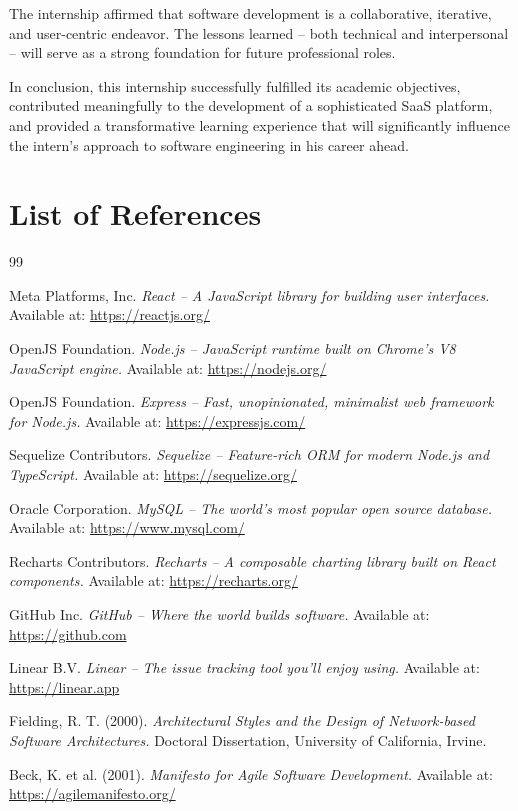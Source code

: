 \documentclass[12pt,a4paper]{article}
\begin{document}
The internship affirmed that software development is a collaborative, iterative, and user-centric endeavor. The lessons learned -- both technical and interpersonal -- will serve as a strong foundation for future professional roles.

\vspace{0.3in}
\noindent In conclusion, this internship successfully fulfilled its academic objectives, contributed meaningfully to the development of a sophisticated SaaS platform, and provided a transformative learning experience that will significantly influence the intern's approach to software engineering in his career ahead.

\newpage
\section{List of References}
\label{chap:references}

\begin{thebibliography}{99}

Meta Platforms, Inc. \textit{React -- A JavaScript library for building user interfaces.} Available at: \url{https://reactjs.org/}

OpenJS Foundation. \textit{Node.js -- JavaScript runtime built on Chrome's V8 JavaScript engine.} Available at: \url{https://nodejs.org/}

OpenJS Foundation. \textit{Express -- Fast, unopinionated, minimalist web framework for Node.js.} Available at: \url{https://expressjs.com/}

Sequelize Contributors. \textit{Sequelize -- Feature-rich ORM for modern Node.js and TypeScript.} Available at: \url{https://sequelize.org/}

Oracle Corporation. \textit{MySQL -- The world's most popular open source database.} Available at: \url{https://www.mysql.com/}

Recharts Contributors. \textit{Recharts -- A composable charting library built on React components.} Available at: \url{https://recharts.org/}

GitHub Inc. \textit{GitHub -- Where the world builds software.} Available at: \url{https://github.com}

Linear B.V. \textit{Linear -- The issue tracking tool you'll enjoy using.} Available at: \url{https://linear.app}

Fielding, R. T. (2000). \textit{Architectural Styles and the Design of Network-based Software Architectures.} Doctoral Dissertation, University of California, Irvine.

Beck, K. et al. (2001). \textit{Manifesto for Agile Software Development.} Available at: \url{https://agilemanifesto.org/}

\end{thebibliography}
\end{document}
